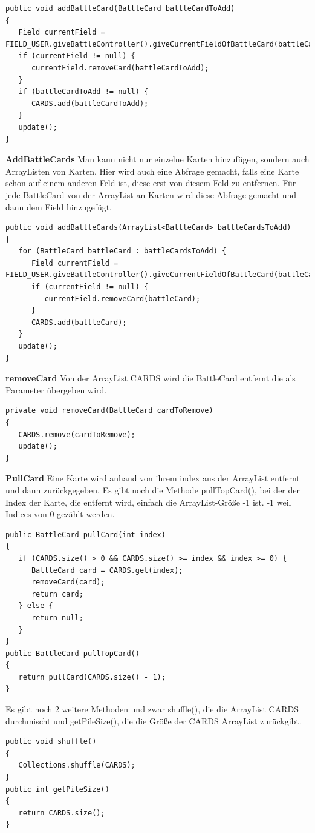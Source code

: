 \begin{lstlisting}[basicstyle=\tiny]
public void addBattleCard(BattleCard battleCardToAdd)
{
   Field currentField = FIELD_USER.giveBattleController().giveCurrentFieldOfBattleCard(battleCardToAdd);
   if (currentField != null) {
      currentField.removeCard(battleCardToAdd);
   }
   if (battleCardToAdd != null) {
      CARDS.add(battleCardToAdd);
   }
   update();
}
\end{lstlisting}

\textbf{AddBattleCards}
Man kann nicht nur einzelne Karten hinzufügen, sondern auch ArrayListen von Karten. Hier wird auch eine Abfrage gemacht, falls eine Karte schon auf einem anderen Feld ist, diese erst von diesem Feld zu entfernen. Für jede BattleCard von der ArrayList an Karten wird diese Abfrage gemacht und dann dem Field hinzugefügt.

\begin{lstlisting}[basicstyle=\tiny]
public void addBattleCards(ArrayList<BattleCard> battleCardsToAdd)
{
   for (BattleCard battleCard : battleCardsToAdd) {
      Field currentField = FIELD_USER.giveBattleController().giveCurrentFieldOfBattleCard(battleCard);
      if (currentField != null) {
         currentField.removeCard(battleCard);
      }
      CARDS.add(battleCard);
   }
   update();
}
\end{lstlisting}

\textbf{removeCard}
Von der ArrayList CARDS wird die BattleCard entfernt die als Parameter übergeben wird.

\begin{lstlisting}
private void removeCard(BattleCard cardToRemove)
{
   CARDS.remove(cardToRemove);
   update();
}
\end{lstlisting}

\textbf{PullCard}
Eine Karte wird anhand von ihrem index aus der ArrayList entfernt und dann zurückgegeben. Es gibt noch die Methode pullTopCard(), bei der der Index der Karte, die entfernt wird, einfach die ArrayList-Größe -1 ist. -1 weil Indices von 0 gezählt werden.
\begin{lstlisting}
public BattleCard pullCard(int index)
{
   if (CARDS.size() > 0 && CARDS.size() >= index && index >= 0) {
      BattleCard card = CARDS.get(index);
      removeCard(card);
      return card;
   } else {
      return null;
   }
}
public BattleCard pullTopCard()
{
   return pullCard(CARDS.size() - 1);
}
\end{lstlisting}
Es gibt noch 2 weitere Methoden und zwar shuffle(), die die ArrayList CARDS durchmischt und getPileSize(), die die Größe der CARDS ArrayList zurückgibt.
\begin{lstlisting}
public void shuffle()
{
   Collections.shuffle(CARDS);
}
public int getPileSize()
{
   return CARDS.size();
}
\end{lstlisting}

